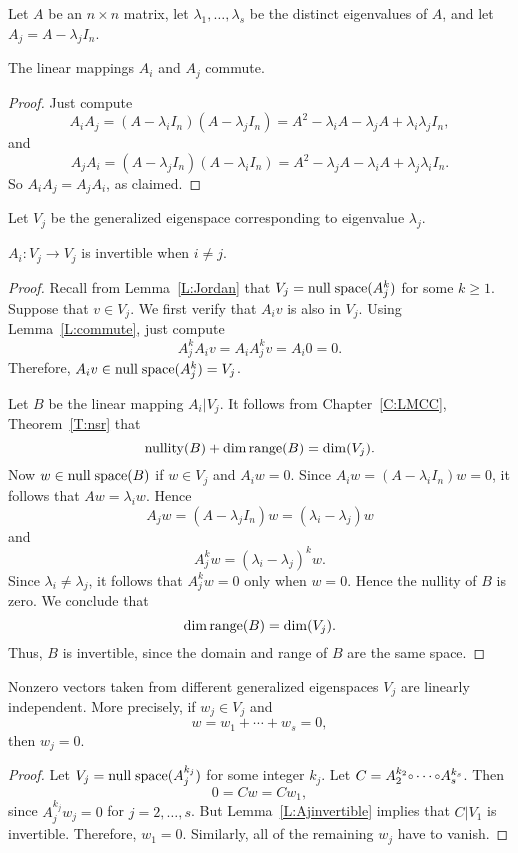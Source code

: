 \documentclass{ximera}
\begin{document}
Let $A$ be an $n\times n$ matrix, let $\lambda_1,\ldots,\lambda_s$ be the
distinct eigenvalues of $A$, and let $A_j = A-\lambda_jI_n$.

\begin{lemma}  \label{L:commute}
The linear mappings $A_i$ and $A_j$ commute.
\end{lemma}

\begin{proof} Just compute
\[
A_iA_j = (A-\lambda_iI_n)(A-\lambda_jI_n)= A^2-\lambda_iA-\lambda_jA+
\lambda_i\lambda_jI_n,
\]
and
\[
A_jA_i = (A-\lambda_jI_n)(A-\lambda_iI_n)= A^2-\lambda_jA-\lambda_iA+
\lambda_j\lambda_iI_n.
\]
So $A_iA_j=A_jA_i$, as claimed.  \end{proof}

Let $V_j$ be the generalized eigenspace corresponding to eigenvalue 
$\lambda_j$. 

\begin{lemma}  \label{L:Ajinvertible}
$A_i:V_j\to V_j$ is invertible when $i\neq j$.
\end{lemma}

\begin{proof}  Recall from Lemma~\ref{L:Jordan} that $V_j={\rm null\;space}(A_j^k)$ for some 
$k\ge 1$.  Suppose that $v\in V_j$.  We first verify that $A_iv$ is also in 
$V_j$.  Using Lemma~\ref{L:commute}, just compute 
\[
A_j^kA_iv = A_iA_j^kv = A_i0 = 0.
\]
Therefore, $A_iv\in{\rm null\;space}(A_j^k)=V_j$.
 
Let $B$ be the linear mapping $A_i|V_j$.  It follows from
Chapter~\ref{C:LMCC}, Theorem~\ref{T:nsr} that
\[
{\rm nullity}(B) +\dim{\rm range}(B) = \dim(V_j).
\]
Now $w\in{\rm null\;space}(B)$ if $w\in V_j$ and $A_iw=0$.  Since
$A_iw = (A-\lambda_iI_n)w = 0$, it follows that $Aw = \lambda_iw$.  Hence 
\[
A_jw = (A-\lambda_jI_n)w = (\lambda_i-\lambda_j)w
\]
and
\[
A_j^kw = (\lambda_i-\lambda_j)^kw.
\]
Since $\lambda_i\neq\lambda_j$, it follows that $A_j^kw=0$ only when $w=0$.
Hence the nullity of $B$ is zero.  We conclude that
\[
\dim{\rm range}(B) = \dim(V_j).
\]
Thus, $B$ is invertible, since the domain and range of $B$ are the same
space.  \end{proof}

\begin{lemma}  \label{L:independentVj}
Nonzero vectors taken from different generalized eigenspaces $V_j$ are 
linearly independent.  More precisely, if $w_j\in V_j$ and 
\[
w = w_1 + \cdots + w_s = 0,
\]
then $w_j=0$.  
\end{lemma}

\begin{proof} Let $V_j={\rm null\;space}(A_j^{k_j})$ for some integer $k_j$.  Let
$C=A_2^{k_2}\compose\cdots\compose A_s^{k_s}$. Then 
\[
0 = Cw = Cw_1,
\]
since $A_j^{k_j}w_j=0$ for $j=2,\ldots,s$.   But Lemma~\ref{L:Ajinvertible} 
implies that $C|V_1$ is invertible.  Therefore, $w_1=0$.  Similarly, all of 
the remaining $w_j$ have to vanish.  \end{proof}
\end{document}
